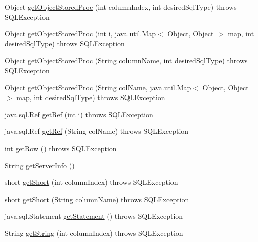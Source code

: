 \begin{DoxyCompactItemize}
\item 
Object \mbox{\hyperlink{classcom_1_1mysql_1_1jdbc_1_1_result_set_impl_a028f86af60dacb114ca80d1cc0637d9b}{get\+Object\+Stored\+Proc}} (int column\+Index, int desired\+Sql\+Type)  throws S\+Q\+L\+Exception 
\item 
Object \mbox{\hyperlink{classcom_1_1mysql_1_1jdbc_1_1_result_set_impl_a30be3e2e7e3998035613e01d5674aa71}{get\+Object\+Stored\+Proc}} (int i, java.\+util.\+Map$<$ Object, Object $>$ map, int desired\+Sql\+Type)  throws S\+Q\+L\+Exception 
\item 
Object \mbox{\hyperlink{classcom_1_1mysql_1_1jdbc_1_1_result_set_impl_a3a52fc30cfaf7a73fca13e48bbc8a5d0}{get\+Object\+Stored\+Proc}} (String column\+Name, int desired\+Sql\+Type)  throws S\+Q\+L\+Exception 
\item 
Object \mbox{\hyperlink{classcom_1_1mysql_1_1jdbc_1_1_result_set_impl_a9d1a5e010a5b824c7c8019dea3ce23e9}{get\+Object\+Stored\+Proc}} (String col\+Name, java.\+util.\+Map$<$ Object, Object $>$ map, int desired\+Sql\+Type)  throws S\+Q\+L\+Exception 
\item 
java.\+sql.\+Ref \mbox{\hyperlink{classcom_1_1mysql_1_1jdbc_1_1_result_set_impl_a1ac9c4862814fa6b5439c71a4f4cdac8}{get\+Ref}} (int i)  throws S\+Q\+L\+Exception 
\item 
java.\+sql.\+Ref \mbox{\hyperlink{classcom_1_1mysql_1_1jdbc_1_1_result_set_impl_af8b105dab46bd80b9d201a544e993e68}{get\+Ref}} (String col\+Name)  throws S\+Q\+L\+Exception 
\item 
int \mbox{\hyperlink{classcom_1_1mysql_1_1jdbc_1_1_result_set_impl_aeab5769a8f98deccc6ec77859c2c4d8f}{get\+Row}} ()  throws S\+Q\+L\+Exception 
\item 
String \mbox{\hyperlink{classcom_1_1mysql_1_1jdbc_1_1_result_set_impl_ab197af35d136130f30ba471848e1737d}{get\+Server\+Info}} ()
\item 
short \mbox{\hyperlink{classcom_1_1mysql_1_1jdbc_1_1_result_set_impl_ac1ce7614ffee29fc12680bf7dd00e689}{get\+Short}} (int column\+Index)  throws S\+Q\+L\+Exception 
\item 
short \mbox{\hyperlink{classcom_1_1mysql_1_1jdbc_1_1_result_set_impl_af2d2439bfaa7c82a682b5f532a641cc8}{get\+Short}} (String column\+Name)  throws S\+Q\+L\+Exception 
\item 
java.\+sql.\+Statement \mbox{\hyperlink{classcom_1_1mysql_1_1jdbc_1_1_result_set_impl_aa273417ff6343608afc4e9dfd9972f8a}{get\+Statement}} ()  throws S\+Q\+L\+Exception 
\item 
String \mbox{\hyperlink{classcom_1_1mysql_1_1jdbc_1_1_result_set_impl_a2f04584d83a8ddae4774dfaeb1a1aac7}{get\+String}} (int column\+Index)  throws S\+Q\+L\+Exception 

\end{DoxyCompactItemize}
